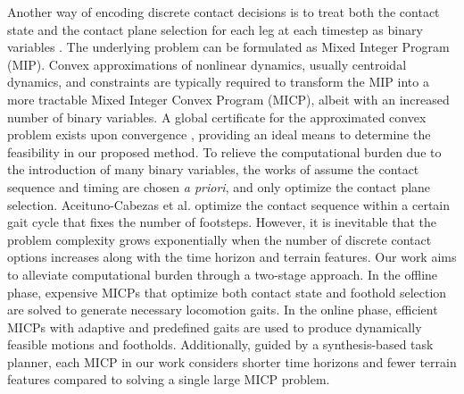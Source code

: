 Another way of encoding discrete contact decisions is to treat both the contact state and the contact plane selection for each leg at each timestep as binary variables \citep{valenzuela2016mixed,shirai2022simultaneous,jiang2023locomotion}. The underlying problem can be formulated as Mixed Integer Program (MIP). Convex approximations of nonlinear dynamics, usually centroidal dynamics, and constraints are typically required to transform the MIP into a more tractable Mixed Integer Convex Program (MICP), albeit with an increased number of binary variables. 
A global certificate for the approximated convex problem exists upon convergence \citep{dai2019global}, providing an ideal means to determine the feasibility in our proposed method.
To relieve the computational burden due to the introduction of many binary variables, the works of \citep{ponton2016convex,ding2020kinodynamic,acosta2023bipedal} assume the contact sequence and timing are chosen \textit{a priori}, and only optimize the contact plane selection. Aceituno-Cabezas et al. \citep{aceituno2017simultaneous} optimize the contact sequence within a certain gait cycle that fixes the number of footsteps. 
However, it is inevitable that the problem complexity grows exponentially when the number of discrete contact options increases along with the time horizon and terrain features. Our work aims to alleviate computational burden through a two-stage approach. In the offline phase, expensive MICPs that optimize both contact state and foothold selection are solved to generate necessary locomotion gaits. In the online phase, efficient MICPs with adaptive and predefined gaits are used to produce dynamically feasible motions and footholds. Additionally, guided by a synthesis-based task planner, each MICP in our work considers shorter time horizons and fewer terrain features compared to solving a single large MICP problem.





